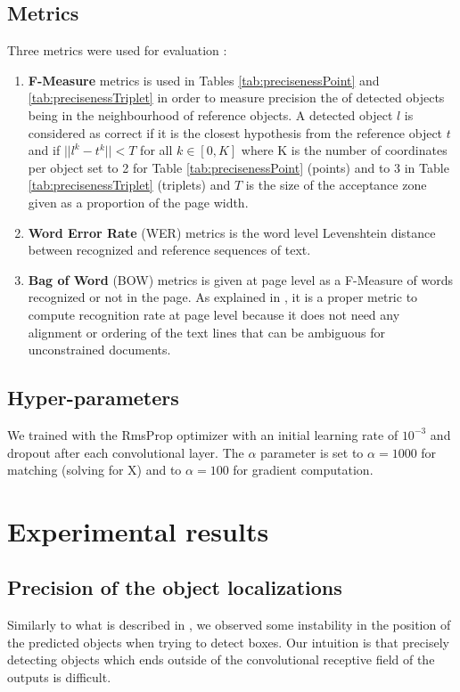 \documentclass[conference]{IEEEtran}
\begin{document}
\subsection{Metrics}
Three metrics were used for evaluation :

\begin{enumerate}
	\item \textbf{F-Measure} metrics is used in Tables \ref{tab:precisenessPoint} and \ref{tab:precisenessTriplet} in order to measure precision the  of detected objects being in the neighbourhood of reference objects. A detected object $l$ is considered as correct if it is the closest hypothesis from the reference object $t$ and if $||l^k - t^k|| < T$ for all $k \in [0,K]$ where K is the number of coordinates per object set to 2 for Table \ref{tab:precisenessPoint} (points) and to 3 in Table \ref{tab:precisenessTriplet} (triplets) and $T$ is the size of the acceptance zone given as a proportion of the page width.
	\item \textbf{Word Error Rate} (WER) metrics is the word level Levenshtein distance \cite{levenshtein1966binary} between recognized and reference sequences of text.
	\item \textbf{Bag of Word} (BOW) metrics is given at page level as a F-Measure of words recognized or not in the page. As explained in \cite{pletschacher2015europeana}, it is a proper metric to compute recognition rate at page level because it does not need any alignment or ordering of the text lines that can be ambiguous for unconstrained documents.

\end{enumerate}



\subsection{Hyper-parameters}
We trained with the RmsProp optimizer \cite{tieleman2012lecture} with an initial learning rate of $10^{-3}$ and dropout after each convolutional layer. The $\alpha$ parameter is set to $\alpha{=}1000$ for matching (solving for X) and to $\alpha{=}100$ for gradient computation.


\section{Experimental results}
\label{sec:results}
\subsection{Precision of the object localizations}
Similarly to what is described in \cite{moysset2016points}, we observed some instability in the position of the predicted objects when trying to detect boxes. Our intuition is that precisely detecting objects which ends outside of the convolutional receptive field of the outputs is difficult.
\end{document}
